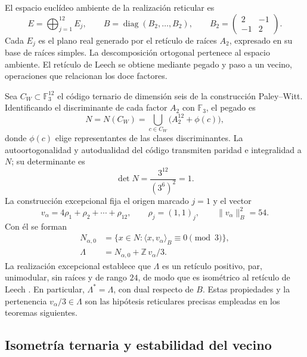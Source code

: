 El espacio euclídeo ambiente de la realización reticular es
\begin{equation}
 E=\bigoplus_{j=1}^{12}E_j,\qquad
 B=\operatorname{diag}(B_2,\ldots,B_2),\qquad
 B_2=\begin{pmatrix}2&-1\\-1&2\end{pmatrix}.
 \label{eq:leech-ambient}
\end{equation}
Cada \(E_j\) es el plano real generado por el retículo de raíces
\(A_2\), expresado en su base de raíces simples. La descomposición
ortogonal pertenece al espacio ambiente. El retículo de Leech se
obtiene mediante pegado y paso a un vecino, operaciones que relacionan
los doce factores.

Sea \(C_W\subset\mathbb F_3^{12}\) el código ternario de dimensión seis
de la construcción Paley--Witt. Identificando el discriminante de cada
factor \(A_2\) con \(\mathbb F_3\), el pegado es
\[
 N=N(C_W)=
 \bigcup_{c\in C_W}\bigl(A_2^{12}+\phi(c)\bigr),
\]
donde \(\phi(c)\) elige representantes de las clases discriminantes.
La autoortogonalidad y autodualidad del código transmiten paridad e
integralidad a \(N\); su determinante es
\[
 \det N=\frac{3^{12}}{(3^6)^2}=1.
\]
La construcción excepcional fija el origen marcado \(j=1\) y el
vector
\begin{equation}
 v_\alpha=4\rho_1+\rho_2+\cdots+\rho_{12},
 \qquad \rho_j=(1,1)_j,\qquad
 \|v_\alpha\|_B^2=54.
 \label{eq:leech-marked-vector}
\end{equation}
Con él se forman
\begin{equation}
\begin{split}
 N_{\alpha,0}
  &=\{x\in N:\langle x,v_\alpha\rangle_B\equiv0\pmod3\},\\
 \Lambda&=N_{\alpha,0}+\mathbb Z\,v_\alpha/3.
\end{split}
\label{eq:leech-neighbour}
\end{equation}
La realización excepcional establece que \(\Lambda\) es un retículo
positivo, par, unimodular, sin raíces y de rango \(24\), de modo que es
isométrico al retículo de Leech \cite{HMT-IV}. En particular,
\(\Lambda^*=\Lambda\), con dual respecto de \(B\).
Estas propiedades y la pertenencia \(v_\alpha/3\in\Lambda\) son las
hipótesis reticulares precisas empleadas en los teoremas siguientes.

\subsection{Isometría ternaria y estabilidad del vecino}
\label{subsec:leech-c3}

